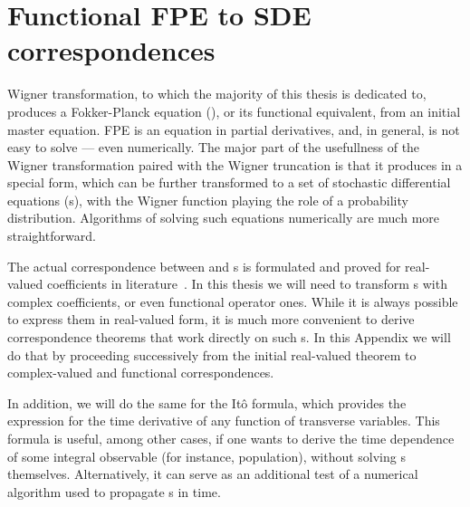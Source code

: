 \chapter{Functional FPE to SDE correspondences}
\label{cha:appendix:fpe-sde}

Wigner transformation, to which the majority of this thesis is dedicated to, produces a Fokker-Planck equation (), or its functional equivalent, from an initial master equation.
FPE is an equation in partial derivatives, and, in general, is not easy to solve --- even numerically.
The major part of the usefullness of the Wigner transformation paired with the Wigner truncation is that it produces  in a special form, which can be further transformed to a set of stochastic differential equations (s), with the Wigner function playing the role of a probability distribution.
Algorithms of solving such equations numerically are much more straightforward.

The actual correspondence between  and s is formulated and proved for real-valued coefficients in literature~\cite{Risken1996}.
In this thesis we will need to transform s with complex coefficients, or even functional operator ones.
While it is always possible to express them in real-valued form, it is much more convenient to derive correspondence theorems that work directly on such s.
In this Appendix we will do that by proceeding successively from the initial real-valued theorem to complex-valued and functional correspondences.

In addition, we will do the same for the It\^o formula, which provides the expression for the time derivative of any function of transverse variables.
This formula is useful, among other cases, if one wants to derive the time dependence of some integral observable (for instance, population), without solving s themselves.
Alternatively, it can serve as an additional test of a numerical algorithm used to propagate s in time.



